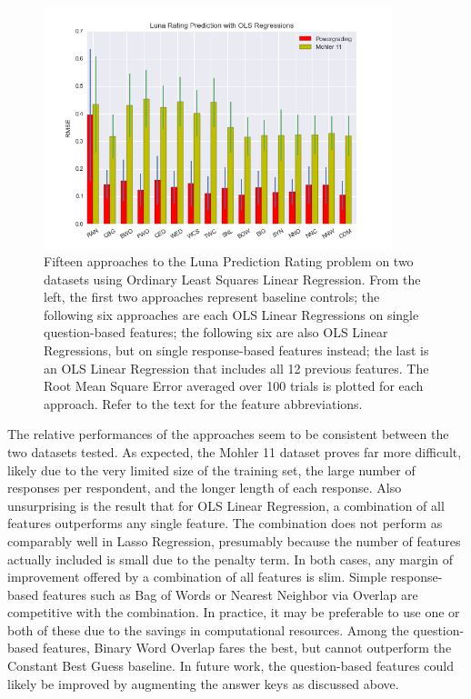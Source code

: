 \begin{figure}[h]
\centerline{%
\includegraphics[width=0.9\textwidth]{figures/ratingPredictionFinalResults2.png}%
}%
\caption{Fifteen approaches to the Luna Prediction Rating problem on two datasets using Ordinary Least Squares Linear Regression. From the left, the first two approaches represent baseline controls; the following six approaches are each OLS Linear Regressions on single question-based features; the following six are also OLS Linear Regressions, but on single response-based features instead; the last is an OLS Linear Regression that includes all 12 previous features. The Root Mean Square Error averaged over 100 trials is plotted for each approach. Refer to the text for the feature abbreviations.}
\label{fig:RatingDistribution}
\end{figure}

The relative performances of the approaches seem to be consistent between the two datasets tested. As expected, the Mohler 11 dataset proves far more difficult, likely due to the very limited size of the training set, the large number of responses per respondent, and the longer length of each response. Also unsurprising is the result that for OLS Linear Regression, a combination of all features outperforms any single feature. The combination does not perform as comparably well in Lasso Regression, presumably because the number of features actually included is small due to the penalty term. In both cases, any margin of improvement offered by a combination of all features is slim. Simple response-based features such as Bag of Words or Nearest Neighbor via Overlap are competitive with the combination. In practice, it may be preferable to use one or both of these due to the savings in computational resources. Among the question-based features, Binary Word Overlap fares the best, but cannot outperform the Constant Best Guess baseline. In future work, the question-based features could likely be improved by augmenting the answer keys as discussed above.

